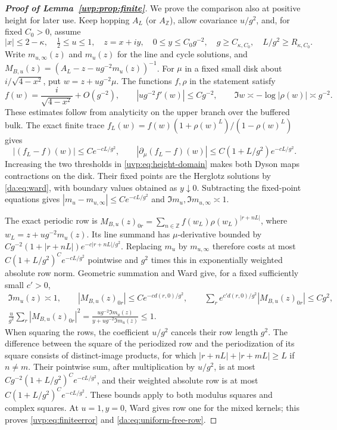 \documentclass[11pt]{article}
\numberwithin{equation}{section}
\theoremstyle{remark}
\begin{document}
\begin{proof}[\textbf{Proof of Lemma~\ref{uvp:prop:finite}}]
We prove the comparison also at positive height for later use.
Keep hopping $A_L$ (or $A_{\mathbb Z}$), allow covariance $u/g^2$,
and, for fixed $C_0>0$, assume
\begin{equation}\label{uvp:eq:height-domain}
 |x|\le2-\kappa,\quad \tfrac12\le u\le1,\quad
 z=x+iy,\quad 0\le y\le C_0g^{-2},\quad
 g\ge C_{\kappa,C_0},\quad L/g^2\ge R_{\kappa,C_0}.
\end{equation}
Write $m_{u,\infty}(z)$ and $m_u(z)$ for the line and cycle solutions,
and $M_{B,u}(z)=(A_L-z-ug^{-2}m_u(z))^{-1}$.
For $\mu$ in a fixed small disk about $i/\sqrt{4-x^2}$, put
$w=z+ug^{-2}\mu$. The functions $f,\rho$ in the statement satisfy
\[
 f(w)=\frac{i}{\sqrt{4-x^2}}+O(g^{-2}),\qquad
 |ug^{-2}f'(w)|\le Cg^{-2},\qquad
 \Im w\asymp-\log|\rho(w)|\asymp g^{-2}.
\]
These estimates follow from analyticity on the upper branch over the
buffered bulk. The exact finite trace
$f_L(w)=f(w)(1+\rho(w)^L)/(1-\rho(w)^L)$ gives
\begin{equation}\label{uvp:eq:fixed-point-derivative}
 |(f_L-f)(w)|\le Ce^{-cL/g^2},\qquad
 |\partial_\mu(f_L-f)(w)|\le C(1+L/g^2)e^{-cL/g^2}.
\end{equation}
Increasing the two thresholds in \eqref{uvp:eq:height-domain} makes
both Dyson maps contractions on the disk. Their fixed points are the
Herglotz solutions by \eqref{da:eq:ward}, with boundary values obtained
as $y\downarrow0$. Subtracting the fixed-point equations gives
$|m_u-m_{u,\infty}|\le Ce^{-cL/g^2}$ and $\Im m_u,\Im m_{u,\infty}\asymp1$.

The exact periodic row is
$M_{B,u}(z)_{0r}=\sum_{n\in\mathbb Z}f(w_L)\rho(w_L)^{|r+nL|}$,
where $w_L=z+ug^{-2}m_u(z)$.
Its line summand has $\mu$-derivative bounded by
$Cg^{-2}(1+|r+nL|)e^{-c|r+nL|/g^2}$.
Replacing $m_u$ by $m_{u,\infty}$ therefore costs at most
$C(1+L/g^2)^Ce^{-cL/g^2}$ pointwise and $g^2$ times this in
exponentially weighted absolute row norm. Geometric summation and Ward
give, for a fixed sufficiently small $c'>0$,
\begin{equation}\label{uvp:eq:height-rows}
 \begin{gathered}
 \Im m_u(z)\asymp1,\qquad |M_{B,u}(z)_{0r}|\le Ce^{-cd(r,0)/g^2},\qquad
 \sum_r e^{c'd(r,0)/g^2}|M_{B,u}(z)_{0r}|\le Cg^2,\\
 \frac{u}{g^2}\sum_r|M_{B,u}(z)_{0r}|^2
 =\frac{ug^{-2}\Im m_u(z)}{y+ug^{-2}\Im m_u(z)}\le1.
 \end{gathered}
\end{equation}
When squaring the rows, the coefficient $u/g^2$ cancels their row
length $g^2$. The difference between the square of the periodized row
and the periodization of its square consists of distinct-image products,
for which $|r+nL|+|r+mL|\ge L$ if $n\ne m$. Their pointwise sum,
after multiplication by $u/g^2$, is at most
$Cg^{-2}(1+L/g^2)^Ce^{-cL/g^2}$, and their weighted absolute row
is at most $C(1+L/g^2)^Ce^{-cL/g^2}$.
These bounds apply to both modulus squares and complex squares.
At $u=1,y=0$, Ward gives row one for the mixed kernels;
this proves \eqref{uvp:eq:finiteerror} and \eqref{da:eq:uniform-free-row}.


\end{proof}
\end{document}
